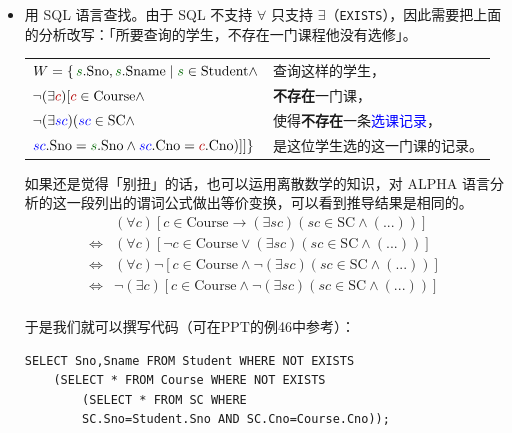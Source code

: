 \documentclass[UTF8]{ctexart}
\begin{document}
\begin{itemize}
    \item 用 SQL 语言查找。由于 SQL 不支持 $\forall$ 只支持 $\exists$（\verb!EXISTS!），因此需要把上面的分析改写：「所要查询的学生，不存在一门课程他没有选修」。
        
    \begin{table}[H]
        \centering
        \begin{tabular}{ll} %
            \newcommand\Student{\mathrm{Student}}
            \newcommand\Sname{\mathrm{Sname}}

            $W = \{\,\textcolor{green!40!black}{s}.\mathrm{Sno}, \textcolor{green!40!black}{s}.\Sname \mid \textcolor{green!40!black}{s} \in \Student \land$
            & 查询这样的\textcolor{green!40!black}{学生}，\\
            $\neg(\exists \textcolor{red!70!black}{c}) [\textcolor{red!70!black}{c} \in \mathrm{Course} \land$
            & \textbf{不存在}一门\textcolor{red!70!black}{课}，\\
            $\neg(\exists \textcolor{blue}{sc}) (\textcolor{blue}{sc} \in \mathrm{SC} \land$
            & 使得\textbf{不存在}一条\textcolor{blue}{选课记录}，\\
            $\textcolor{blue}{sc}.\mathrm{Sno} = \textcolor{green!40!black}{s}.\mathrm{Sno} \land \textcolor{blue}{sc}.\mathrm{Cno} = \textcolor{red!70!black}{c}.\mathrm{Cno})]]\}$
            & 是这位\textcolor{green!40!black}{学生}选的这一门\textcolor{red!70!black}{课}的记录。
        \end{tabular}
    \end{table}
        
        如果还是觉得「别扭」的话，也可以运用离散数学的知识，对 ALPHA 语言分析的这一段列出的谓词公式做出等价变换，可以看到推导结果是相同的。
\begin{align*}
          & (\forall c)[c\in\mathrm{Course} \to (\exists sc)(sc\in\mathrm{SC} \wedge (...))] \\
     \iff & (\forall c)[\neg c\in\mathrm{Course} \vee (\exists sc)(sc\in\mathrm{SC} \wedge (...))] \\
     \iff & (\forall c)\neg [c\in\mathrm{Course} \wedge \neg(\exists sc)(sc\in\mathrm{SC} \wedge (...))] \\
     \iff & \neg(\exists c) [c\in\mathrm{Course} \wedge \neg(\exists sc)(sc\in\mathrm{SC} \wedge (...))] \\
\end{align*}
        
        于是我们就可以撰写代码（可在PPT的例46中参考）：
\begin{lstlisting}
SELECT Sno,Sname FROM Student WHERE NOT EXISTS 
    (SELECT * FROM Course WHERE NOT EXISTS 
        (SELECT * FROM SC WHERE 
        SC.Sno=Student.Sno AND SC.Cno=Course.Cno));
\end{lstlisting}
\end{itemize}
\end{document}
